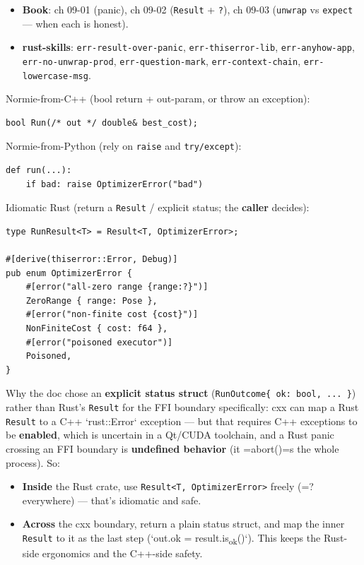 \documentclass[11pt]{article}
\begin{document}
\begin{itemize}
\item \textbf{\textbf{Book}}: ch 09-01 (panic), ch 09-02 (\texttt{Result} + \texttt{?}),
ch 09-03 (\texttt{unwrap} vs \texttt{expect} — when each is honest).
\item \textbf{\textbf{rust-skills}}: \texttt{err-result-over-panic}, \texttt{err-thiserror-lib},
\texttt{err-anyhow-app}, \texttt{err-no-unwrap-prod}, \texttt{err-question-mark},
\texttt{err-context-chain}, \texttt{err-lowercase-msg}.
\end{itemize}

Normie-from-C++ (bool return + out-param, or throw an exception):

\begin{verbatim}
bool Run(/* out */ double& best_cost);
\end{verbatim}

Normie-from-Python (rely on \texttt{raise} and \texttt{try/except}):

\begin{verbatim}
def run(...):
    if bad: raise OptimizerError("bad")
\end{verbatim}

Idiomatic Rust (return a \texttt{Result} / explicit status; the \textbf{caller} decides):

\begin{verbatim}
type RunResult<T> = Result<T, OptimizerError>;

#[derive(thiserror::Error, Debug)]
pub enum OptimizerError {
    #[error("all-zero range {range:?}")]
    ZeroRange { range: Pose },
    #[error("non-finite cost {cost}")]
    NonFiniteCost { cost: f64 },
    #[error("poisoned executor")]
    Poisoned,
}
\end{verbatim}

Why the doc chose an \textbf{\textbf{explicit status struct}} (\texttt{RunOutcome\{ ok: bool, ... \}})
rather than Rust's \texttt{Result} for the FFI boundary specifically: cxx can map a
Rust \texttt{Result} to a C++ `rust::Error` exception — but that requires C++
exceptions to be \textbf{\textbf{enabled}}, which is uncertain in a Qt/CUDA toolchain, and a
Rust panic crossing an FFI boundary is \textbf{undefined behavior} (it =abort()=s the
whole process). So:

\begin{itemize}
\item \textbf{\textbf{Inside}} the Rust crate, use \texttt{Result<T, OptimizerError>} freely (=?
everywhere) — that's idiomatic and safe.
\item \textbf{\textbf{Across}} the cxx boundary, return a plain status struct, and map the inner
\texttt{Result} to it as the last step (`out.ok = result.is\textsubscript{ok}()`). This keeps the
Rust-side ergonomics and the C++-side safety.
\end{itemize}
\end{document}
